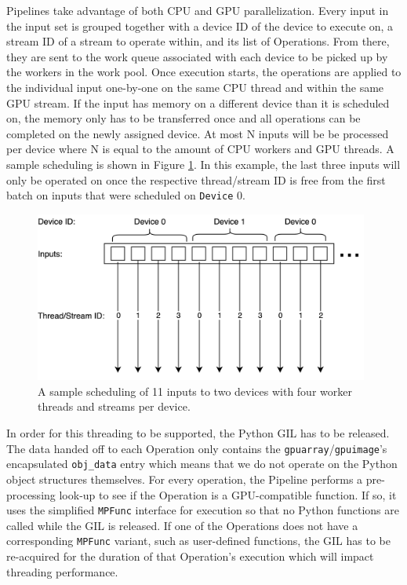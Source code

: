 \quad Pipelines take advantage of both CPU and GPU parallelization. Every input in the input set is grouped together with a device ID of the device to execute on, a stream ID of a stream to operate within, and its list of Operations. From there, they are sent to the work queue associated with each device to be picked up by the workers in the work pool. Once execution starts, the operations are applied to the individual input one-by-one on the same CPU thread and within the same GPU stream. If the input has memory on a different device than it is scheduled on, the memory only has to be transferred once and all operations can be completed on the newly assigned device. At most N inputs will be be processed per device where N is equal to the amount of CPU workers and GPU threads. A sample scheduling is shown in Figure \ref{pipeline}. In this example, the last three inputs will only be operated on once the respective thread/stream ID is free from the first batch on inputs that were scheduled on \verb|Device| 0.

\begin{figure}[hbtp]
\includegraphics[width=110mm]{figures/pipeline.png}
\centering
\caption{A sample scheduling of 11 inputs to two devices with four worker threads and streams per device.}
\label{pipeline}
\end{figure}

\quad In order for this threading to be supported, the Python GIL has to be released. The data handed off to each Operation only contains the \verb|gpuarray|/\verb|gpuimage|'s encapsulated \verb|obj_data| entry which means that we do not operate on the Python object structures themselves. For every operation, the Pipeline performs a pre-processing look-up to see if the Operation is a GPU-compatible function. If so, it uses the simplified \verb|MPFunc| interface for execution so that no Python functions are called while the GIL is released. If one of the Operations does not have a corresponding \verb|MPFunc| variant, such as user-defined functions, the GIL has to be re-acquired for the duration of that Operation's execution which will impact threading performance.


